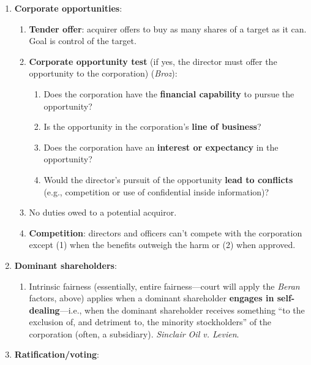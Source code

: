 \begin{enumerate}
\begin{enumerate}
        \item \textbf{Corporate opportunities}:
        \begin{enumerate}
            \item \textbf{Tender offer}: acquirer offers to buy as many shares 
            of a target as it can. Goal is control of the target.
            \item \textbf{Corporate opportunity test} (if yes, the director 
            must offer the opportunity to the corporation) (\emph{Broz}): %
            \begin{enumerate}
                \item Does the corporation have the \textbf{financial 
                capability} to pursue the opportunity?
                \item Is the opportunity in the corporation's \textbf{line of 
                business}?
                \item Does the corporation have an \textbf{interest or 
                expectancy} in the opportunity?
                \item Would the director's pursuit of the opportunity 
                \textbf{lead to conflicts} (e.g., competition or use of 
                confidential inside information)?
            \end{enumerate}
            \item No duties owed to a potential acquiror.
            \item \textbf{Competition}: directors and officers can't compete 
            with the corporation except (1) when the benefits outweigh the 
            harm or (2) when approved.
        \end{enumerate}
        \item \textbf{Dominant shareholders}:
        \begin{enumerate}
            \item Intrinsic fairness (essentially, entire fairness---court 
            will apply the \emph{Beran} factors, above) applies 
            when a dominant shareholder \textbf{engages in 
            self-dealing}---i.e., when the dominant shareholder receives 
            something ``to the exclusion of, and detriment to, the minority 
            stockholders'' of the corporation (often, a subsidiary). 
            \emph{Sinclair Oil v. Levien}.
        \end{enumerate}
        \item \textbf{Ratification/voting}:
        \begin{enumerate}

\end{enumerate}
\end{enumerate}
\end{enumerate}
